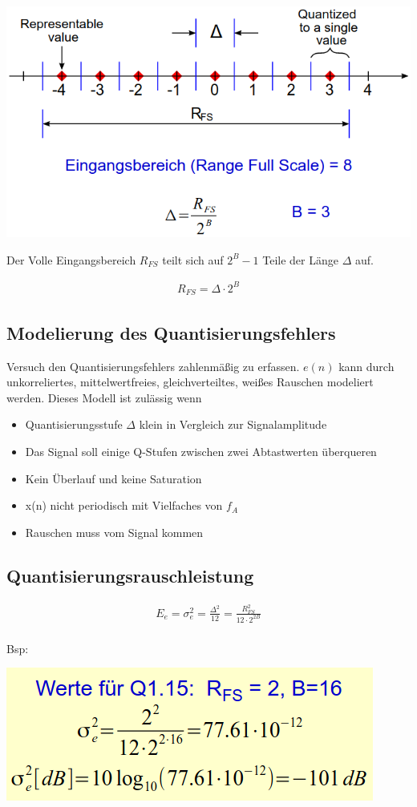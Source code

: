 \documentclass[10pt,a4paper]{article}
\begin{document}
\begin{center}
    \includegraphics[width=.45\textwidth]{./img/rangefullscale.png}
\end{center}
Der Volle Eingangsbereich $R_{FS}$ teilt sich auf $2^B-1$ Teile der Länge $\Delta$ auf.
  \begin{mdframed}[style=exercise]
    \begin{align}
        R_{FS} = \Delta \cdot 2^{B}
    \end{align}
  \end{mdframed}

\subsection{Modelierung des Quantisierungsfehlers}
Versuch den Quantisierungsfehlers zahlenmäßig zu erfassen.
$e(n)$ kann durch unkorreliertes, mittelwertfreies, gleichverteiltes, weißes Rauschen modeliert werden.
Dieses Modell ist zulässig wenn
\begin{itemize}
    \item Quantisierungsstufe $\Delta$ klein in Vergleich zur Signalamplitude
    \item Das Signal soll einige Q-Stufen zwischen zwei Abtastwerten überqueren
    \item Kein Überlauf und keine Saturation
    \item x(n) nicht periodisch mit Vielfaches von $f_A$
    \item Rauschen muss vom Signal kommen
\end{itemize}

\subsection{Quantisierungsrauschleistung}
  \begin{mdframed}[style=exercise]
    \begin{align}
        E_e = \sigma_e^2 = \frac{\Delta^2}{12} = \frac{R_{FS}^2}{12\cdot 2^{2B}} \\
    \end{align}
  \end{mdframed}
Bsp:
\begin{center}
    \includegraphics[width=.4\textwidth]{./img/sqnr_eq.png}
\end{center}
\end{document}
